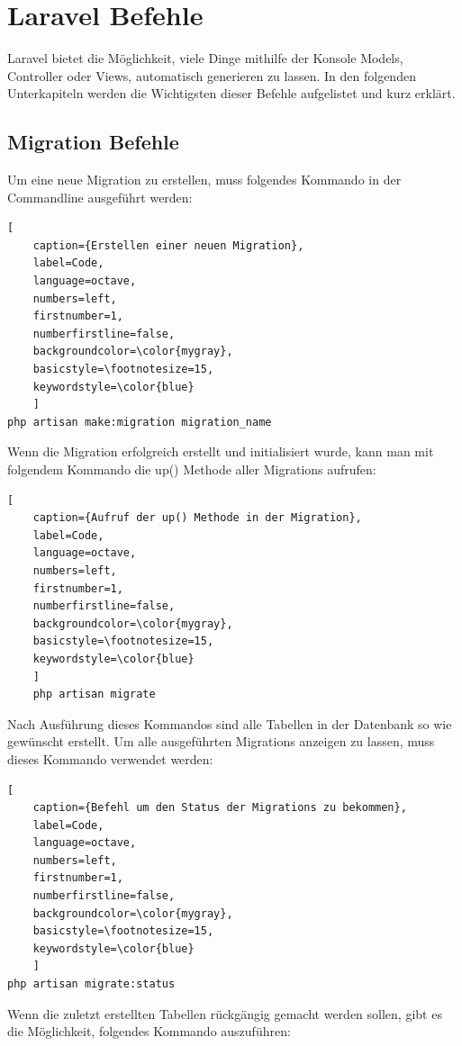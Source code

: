 \section{Laravel Befehle}\label{sec Laravel Befehle}
Laravel bietet die Möglichkeit, viele Dinge mithilfe der Konsole Models, Controller oder Views, automatisch generieren zu lassen. In den folgenden Unterkapiteln werden die Wichtigsten dieser Befehle aufgelistet und kurz erklärt.
\subsection{Migration Befehle}\label{sec Migration Befehle}
Um eine neue Migration zu erstellen, muss folgendes Kommando in der Commandline ausgeführt werden:
\renewcommand{\lstlistingname}{Quellcode}

\begin{lstlisting}[
	caption={Erstellen einer neuen Migration},
	label=Code,
	language=octave,
	numbers=left,
	firstnumber=1,
	numberfirstline=false,
	backgroundcolor=\color{mygray},
	basicstyle=\footnotesize=15,
	keywordstyle=\color{blue}
	]
php artisan make:migration migration_name
\end{lstlisting}
Wenn die Migration erfolgreich erstellt und initialisiert wurde, kann man mit folgendem Kommando die up() Methode aller Migrations aufrufen:
\renewcommand{\lstlistingname}{Quellcode}

\begin{lstlisting}[
	caption={Aufruf der up() Methode in der Migration},
	label=Code,
	language=octave,
	numbers=left,
	firstnumber=1,
	numberfirstline=false,
	backgroundcolor=\color{mygray},
	basicstyle=\footnotesize=15,
	keywordstyle=\color{blue}
	]
	php artisan migrate
\end{lstlisting}
Nach Ausführung dieses Kommandos sind alle Tabellen in der Datenbank so wie gewünscht erstellt. 
Um alle ausgeführten Migrations anzeigen zu lassen, muss dieses Kommando verwendet werden:
\renewcommand{\lstlistingname}{Quellcode}

\begin{lstlisting}[
	caption={Befehl um den Status der Migrations zu bekommen},
	label=Code,
	language=octave,
	numbers=left,
	firstnumber=1,
	numberfirstline=false,
	backgroundcolor=\color{mygray},
	basicstyle=\footnotesize=15,
	keywordstyle=\color{blue}
	]
php artisan migrate:status
\end{lstlisting}
Wenn die zuletzt erstellten Tabellen rückgängig gemacht werden sollen, gibt es die Möglichkeit, folgendes Kommando auszuführen:
\renewcommand{\lstlistingname}{Quellcode}


